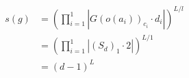 \documentclass[preview]{standalone}
\begin{document}
\begin{align*}
s(g) &= \left(\prod_{i=1}^{1}\left|G(o(a_i))_{c_i}\cdot d_i\right|\right)^{L/l} \\   &= \left(\prod_{i=1}^{1}\left|\left(S_d\right)_{1}\cdot 2\right|\right)^{L/1} \\   &= (d-1)^{L}
\end{align*}
\end{document}
